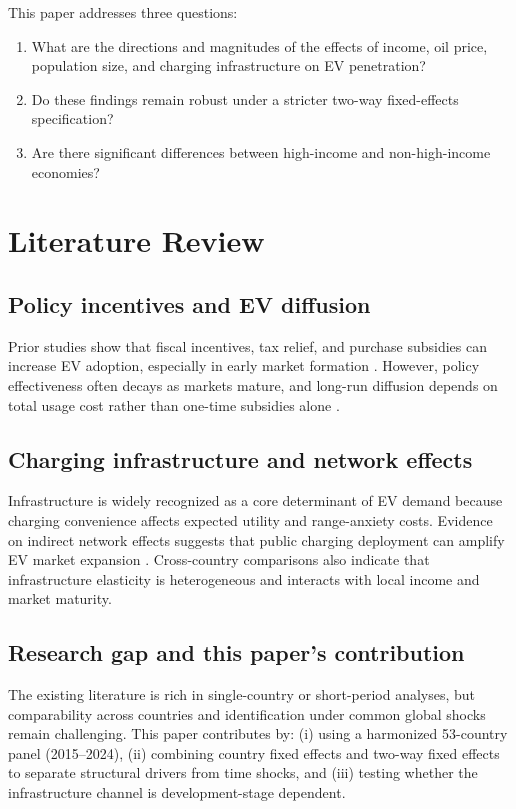 \documentclass[a4paper,12pt]{article}
\begin{document}
This paper addresses three questions:
\begin{enumerate}
    \item What are the directions and magnitudes of the effects of income, oil price, population size, and charging infrastructure on EV penetration?
    \item Do these findings remain robust under a stricter two-way fixed-effects specification?
    \item Are there significant differences between high-income and non-high-income economies?
\end{enumerate}

\section{Literature Review}
\subsection{Policy incentives and EV diffusion}
Prior studies show that fiscal incentives, tax relief, and purchase subsidies can increase EV adoption, especially in early market formation \cite{Sierzchula2014,Hall2017}. However, policy effectiveness often decays as markets mature, and long-run diffusion depends on total usage cost rather than one-time subsidies alone \cite{Hardman2018}.

\subsection{Charging infrastructure and network effects}
Infrastructure is widely recognized as a core determinant of EV demand because charging convenience affects expected utility and range-anxiety costs. Evidence on indirect network effects suggests that public charging deployment can amplify EV market expansion \cite{Li2017}. Cross-country comparisons also indicate that infrastructure elasticity is heterogeneous and interacts with local income and market maturity.

\subsection{Research gap and this paper's contribution}
The existing literature is rich in single-country or short-period analyses, but comparability across countries and identification under common global shocks remain challenging. This paper contributes by: (i) using a harmonized 53-country panel (2015--2024), (ii) combining country fixed effects and two-way fixed effects to separate structural drivers from time shocks, and (iii) testing whether the infrastructure channel is development-stage dependent.
\end{document}
